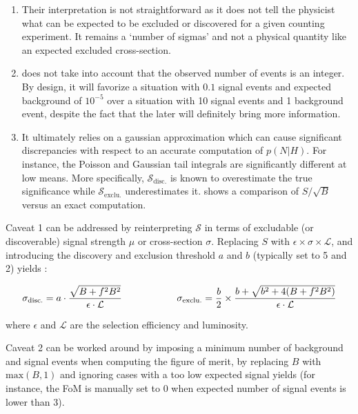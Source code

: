     \begin{enumerate}
      \item Their interpretation is not straightforward as it does not tell the
            physicist what can be expected to be excluded or discovered
            for a given counting experiment. It remains a `number of sigmas' and not a
            physical quantity like an expected excluded cross-section.
      \item {} does not take into account that
            the observed number of events is an integer. By design, it will favorize a situation
            with $0.1$ signal events and expected background of $10^{-5}$ over a
            situation with 10 signal events and 1 background event, despite the fact that
            the later will definitely bring more information.
      \item It ultimately relies on a gaussian approximation which can cause significant
            discrepancies with respect to an accurate computation of $p(N|H)$. For instance,
            the Poisson and Gaussian tail integrals are significantly different at low
            means. More specifically, $\mathcal{S}_\text{disc.}$ is known to overestimate
            the true significance while $\mathcal{S}_\text{exclu.}$ underestimates it.
             shows a comparison of $S/\sqrt{B}$ versus an exact
            computation.
    \end{enumerate}

    Caveat 1 can be addressed by reinterpreting $\mathcal{S}$ in terms of excludable
    (or discoverable) signal strength $\mu$ or cross-section $\sigma$. Replacing
    $S$ with $\epsilon \times \sigma \times \mathcal{L}$, and introducing the discovery
    and exclusion threshold $a$ and $b$ (typically set to 5 and 2) yields :

    \begin{equation}
        \mathcal{\sigma}_\text{disc.} = a \cdot \frac{\sqrt{B+f^2B^2}}{\epsilon \cdot \mathcal{L}}
       \hspace*{2cm}
       \mathcal{\sigma}_\text{exclu.} = \frac{b}{2} \times \frac{b + \sqrt{b^2 + 4 (B + f^2B^2)}}{\epsilon \cdot \mathcal{L}}
       \label{FoM2}
    \end{equation}

    where $\epsilon$ and $\mathcal{L}$ are the selection efficiency and luminosity.

    Caveat 2 can be worked around by imposing a minimum number of background and signal
    events when computing the figure of merit, by replacing $B$ with $\text{max}(B,1)$
    and ignoring cases with a too low expected signal yields (for instance, the FoM is
    manually set to 0 when expected number of signal events is lower than 3).

